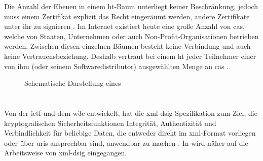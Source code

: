 Die Anzahl der Ebenen in einem \gls{ht}-Baum unterliegt keiner Beschränkung, jedoch muss einem Zertifikat explizit das Recht eingeräumt werden, andere
Zertifikate unter ihr zu signieren \cite{kits}. Im Internet existiert heute eine große Anzahl von \glspl{ca}, welche von Staaten, Unternehmen oder auch
Non-Profit-Organisationen betrieben werden. Zwischen diesen einzelnen Bäumen besteht keine Verbindung und auch keine Vertrauensbeziehung. Deshalb vertraut bei
einem \gls{ht} jeder Teilnehmer einer von ihm (oder seinem Softwaredistributor) ausgewählten Menge an \glspl{ca} \cite{ssliverse:eff,krypto-pki-internet}.

\begin{figure}
\centering

\caption{Schematische Darstellung eines \texorpdfstring{\protect{}}{HT}}
\label{fig:ht}
\end{figure}

\section{}
\label{sec:GrundlagenDefinitionen:xml-dsig}
Von der \gls{ietf} und dem \gls{w3c} entwickelt, hat die \gls{xml-dsig} Spezifikation zum Ziel, die kryptografischen Sicherheitsfunktionen Integrität,
Authentizität und Verbindlichkeit für beliebige Daten, die entweder direkt im \gls{xml}-Format vorliegen oder über \glspl{uri} ansprechbar sind, anwendbar zu
machen \cite{krypto-pki-internet}. In  wird näher auf die Arbeitsweise von \gls{xml-dsig} eingegangen.

